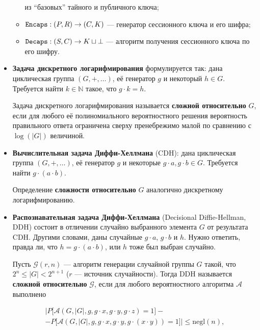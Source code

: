 \documentclass[a4paper,14pt]{extarticle}
\begin{document}
\begin{itemize}
\begin{itemize}
                из ``базовых'' тайного и публичного ключа;
            \item $\verb|Encaps|: (P, R) \to (C, K)$ --- генератор сессионного
                ключа и его шифра;
            \item $\verb|Decaps|: (S, C) \to K \sqcup \bot$ --- алгоритм
                получения сессионного ключа по его шифру.
        \end{itemize}
    \item \textbf{Задача дискретного логарифмирования} формулируется так: дана
        циклическая группа $(G, +, \dots)$, её генератор $g$ и некоторый
        $h \in G$. Требуется найти $k \in \mathbb{N}$ такое, что
        $g \cdot k = h$.

        Задача дискретного логарифмирования называется
        \textbf{сложной относительно} $G$, если для любого её полиномиального
        вероятностного решения вероятность правильного ответа ограничена сверху
        пренебрежимо малой по сравнению с $\log(|G|)$ величиной.
    \item \textbf{Вычислительная задача Диффи-Хеллмана} (CDH): дана циклическая
        группа $(G, +, \dots)$, её генератор $g$ и некоторые
        $g \cdot a, g \cdot b \in G$. Требуется найти $g \cdot (a \cdot b)$.

        Определение \textbf{сложности относительно} $G$ аналогично дискретному
        логарифмированию.
    \item \textbf{Распознавательная задача Диффи-Хеллмана} (Decisional
        Diffie-Hellman, DDH) состоит в отличении случайно выбранного элемента
        $G$ от результата CDH. Другими словами, даны случайные $g \cdot a$,
        $g \cdot b$ и $h$. Нужно ответить, правда ли, что
        $h = g \cdot (a \cdot b)$, или $h$ тоже был выбран случайно.

        Пусть $\mathcal{G}(r, n)$ --- алгоритм генерации случайной группы $G$
        такой, что $2^n \le |G| < 2^{n + 1}$ ($r$ --- источник случайности).
        Тогда DDH называется \textbf{сложной относительно} $\mathcal{G}$, если
        для любого вероятностного алгоритма $\mathcal{A}$ выполнено

        \begin{multline*}
            \bigg| P \Big[
                \mathcal{A}(G, |G|, g, g \cdot x, g \cdot y, g \cdot z) = 1
            \Big] -\\- P \Big[ \mathcal{A}(
                G, |G|, g, g \cdot x, g \cdot y, g \cdot (x \cdot y)
            ) = 1 \Big] \bigg| \le \mathrm{negl}(n),
        \end{multline*}


\end{itemize}
\end{document}
